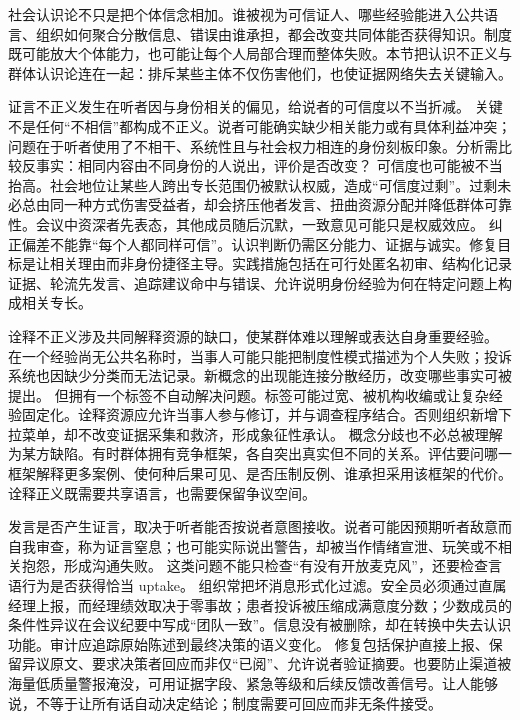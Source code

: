 社会认识论不只是把个体信念相加。谁被视为可信证人、哪些经验能进入公共语言、组织如何聚合分散信息、错误由谁承担，都会改变共同体能否获得知识。制度既可能放大个体能力，也可能让每个人局部合理而整体失败。本节把认识不正义与群体认识论连在一起：排斥某些主体不仅伤害他们，也使证据网络失去关键输入。

证言不正义发生在听者因与身份相关的偏见，给说者的可信度以不当折减。\parencite{fricker2007} 关键不是任何“不相信”都构成不正义。说者可能确实缺少相关能力或有具体利益冲突；问题在于听者使用了不相干、系统性且与社会权力相连的身份刻板印象。分析需比较反事实：相同内容由不同身份的人说出，评价是否改变？ 可信度也可能被不当抬高。社会地位让某些人跨出专长范围仍被默认权威，造成“可信度过剩”。过剩未必总由同一种方式伤害受益者，却会挤压他者发言、扭曲资源分配并降低群体可靠性。会议中资深者先表态，其他成员随后沉默，一致意见可能只是权威效应。 纠正偏差不能靠“每个人都同样可信”。认识判断仍需区分能力、证据与诚实。修复目标是让相关理由而非身份捷径主导。实践措施包括在可行处匿名初审、结构化记录证据、轮流先发言、追踪建议命中与错误、允许说明身份经验为何在特定问题上构成相关专长。

诠释不正义涉及共同解释资源的缺口，使某群体难以理解或表达自身重要经验。\parencite{fricker2007} 在一个经验尚无公共名称时，当事人可能只能把制度性模式描述为个人失败；投诉系统也因缺少分类而无法记录。新概念的出现能连接分散经历，改变哪些事实可被提出。 但拥有一个标签不自动解决问题。标签可能过宽、被机构收编或让复杂经验固定化。诠释资源应允许当事人参与修订，并与调查程序结合。否则组织新增下拉菜单，却不改变证据采集和救济，形成象征性承认。 概念分歧也不必总被理解为某方缺陷。有时群体拥有竞争框架，各自突出真实但不同的关系。评估要问哪一框架解释更多案例、使何种后果可见、是否压制反例、谁承担采用该框架的代价。诠释正义既需要共享语言，也需要保留争议空间。

发言是否产生证言，取决于听者能否按说者意图接收。说者可能因预期听者敌意而自我审查，称为证言窒息；也可能实际说出警告，却被当作情绪宣泄、玩笑或不相关抱怨，形成沟通失败。\parencite{dotson2011} 这类问题不能只检查“有没有开放麦克风”，还要检查言语行为是否获得恰当 uptake。 组织常把坏消息形式化过滤。安全员必须通过直属经理上报，而经理绩效取决于零事故；患者投诉被压缩成满意度分数；少数成员的条件性异议在会议纪要中写成“团队一致”。信息没有被删除，却在转换中失去认识功能。审计应追踪原始陈述到最终决策的语义变化。 修复包括保护直接上报、保留异议原文、要求决策者回应而非仅“已阅”、允许说者验证摘要。也要防止渠道被海量低质量警报淹没，可用证据字段、紧急等级和后续反馈改善信号。让人能够说，不等于让所有话自动决定结论；制度需要可回应而非无条件接受。

